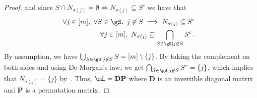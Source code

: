 \documentclass{article}
\begin{document}
\begin{proof}
and since $S \cap N_{\sigma(j)} = \emptyset \iff N_{\sigma(j)} \subseteq S^c$ we have that
\begin{align}
    \forall j \in [m],\ \forall S \in \gS,\ j \not\in S \implies N_{\sigma(j)} \subseteq S^c \\
    \forall j \in [m],\ N_{\sigma(j)} \subseteq \bigcap_{S \in \gS \mid j \not\in S} S^c \,. \label{eq:last_intersect}
\end{align}
By assumption, we have $\bigcup_{S \in \gS \mid j \not\in S} S = [m] \setminus \{j\}$. By taking the complement on both sides and using De Morgan's law, we get $\bigcap_{S \in \gS \mid j \not\in S} S^c = \{j\}$, which implies that $N_{\sigma(j)} = \{j\}$ by~. Thus, $\mL = \mathbf{D}\mathbf{P}$ where $\mathbf{D}$ is an invertible diagonal matrix and $\mathbf{P}$ is a permutation matrix.
\end{proof}
\end{document}
